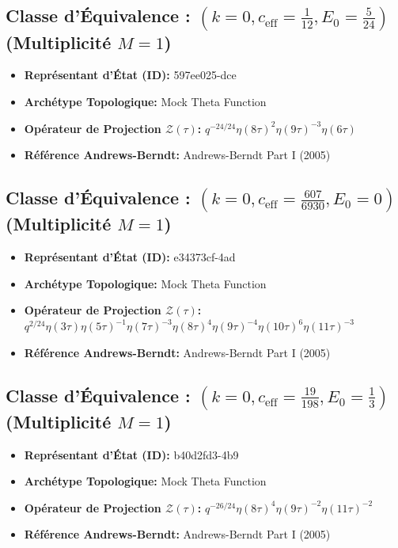 \documentclass[11pt,twoside,openright]{book}
\begin{document}
\subsection*{Classe d'Équivalence : $(k=0, c_{\text{eff}}=\frac{1}{12}, E_0=\frac{5}{24})$ (Multiplicité $M=1$)}
\begin{itemize}
  \item \textbf{Représentant d'État (ID):} 597ee025-dce
  \item \textbf{Archétype Topologique:} Mock Theta Function
  \item \textbf{Opérateur de Projection $\mathcal{Z}(\tau)$:} $q^{-24/24} \eta(8\tau)^{2} \eta(9\tau)^{-3} \eta(6\tau)$
  \item \textbf{Référence Andrews-Berndt:} Andrews-Berndt Part I (2005)
\end{itemize}

\subsection*{Classe d'Équivalence : $(k=0, c_{\text{eff}}=\frac{607}{6930}, E_0=0)$ (Multiplicité $M=1$)}
\begin{itemize}
  \item \textbf{Représentant d'État (ID):} e34373cf-4ad
  \item \textbf{Archétype Topologique:} Mock Theta Function
  \item \textbf{Opérateur de Projection $\mathcal{Z}(\tau)$:} $q^{2/24} \eta(3\tau) \eta(5\tau)^{-1} \eta(7\tau)^{-3} \eta(8\tau)^{4} \eta(9\tau)^{-4} \eta(10\tau)^{6} \eta(11\tau)^{-3}$
  \item \textbf{Référence Andrews-Berndt:} Andrews-Berndt Part I (2005)
\end{itemize}

\subsection*{Classe d'Équivalence : $(k=0, c_{\text{eff}}=\frac{19}{198}, E_0=\frac{1}{3})$ (Multiplicité $M=1$)}
\begin{itemize}
  \item \textbf{Représentant d'État (ID):} b40d2fd3-4b9
  \item \textbf{Archétype Topologique:} Mock Theta Function
  \item \textbf{Opérateur de Projection $\mathcal{Z}(\tau)$:} $q^{-26/24} \eta(8\tau)^{4} \eta(9\tau)^{-2} \eta(11\tau)^{-2}$
  \item \textbf{Référence Andrews-Berndt:} Andrews-Berndt Part I (2005)
\end{itemize}
\end{document}
